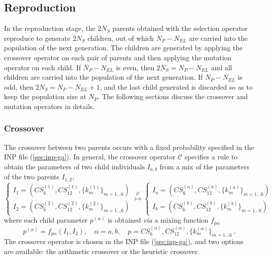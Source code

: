 \documentclass[10pt,a4paper]{report}
\numberwithin{equation}{section}
\begin{document}
\subsection{Reproduction}
\label{sec:ga-reproduction}

In the reproduction stage, the $2N_S$ parents obtained with the selection
operator reproduce to generate $2N_S$ children, out of which $N_P-N_{EL}$
are carried into the population of the next generation. The children are
generated by applying the crossover operator on each
pair of parents and then applying the mutation
operator on each child. If $N_P-N_{EL}$ is even, then $2N_S=N_P-N_{EL}$
and all children are carried into the population of the next generation. If
$N_P - N_{EL}$ is odd, then $2N_S=N_P-N_{EL}+1$, and the last child
generated is discarded so as to keep the population size at $N_P$.
The following sections discuss the crossover and mutation operators in details.

\subsubsection{Crossover}
\label{sec:ga-crossover}

The crossover between two parents occurs with a fixed probability
specified in the INP file (\autoref{sec:inp-ga}). In general, the
crossover operator $\mathcal{C}$ specifies a rule to obtain the
parameters of two child individuals $I_{a,b}$ from a mix of the
parameters of the two parents $I_{1,2}$,
\begin{equation}
  \label{eq:ga-crossover}
  \left\{
    \begin{array}{l}
      I_1 = (CS_6^{(1)},CS_{12}^{(1)},\{k_m^{(1)}\}_{m=1\ldots 6}) \\
      I_2 = (CS_6^{(2)},CS_{12}^{(2)},\{k_m^{(2)}\}_{m=1\ldots 6})
    \end{array}
  \right.
  \overset{\mathcal{C}}{\longmapsto}
    \left\{
    \begin{array}{l}
      I_a = (CS_6^{(a)},CS_{12}^{(a)},\{k_m^{(a)}\}_{m=1\ldots 6}) \\
      I_b = (CS_6^{(b)},CS_{12}^{(b)},\{k_m^{(b)}\}_{m=1\ldots 6})
    \end{array}
  \right.
\end{equation}
where each child parameter $p^{(\alpha)}$ is obtained \textit{via} a mixing function $f_{p\alpha}$
\begin{equation*}
  p^{(\alpha)} = f_{p\alpha}(I_1,I_2),\quad \alpha=a,b, \quad p = CS_6^{(\alpha)},CS_{12}^{(\alpha)},\{k_m^{(\alpha)}\}_{m=1\ldots 6}\ .
\end{equation*}
The crossover operator is chosen in the INP file
(\autoref{sec:inp-ga}), and two options are available: the arithmetic
crossover or the heuristic crossover.
\end{document}
